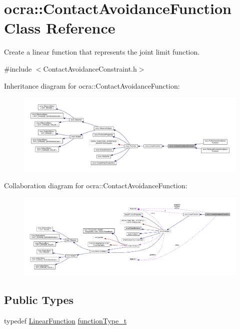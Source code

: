 \hypertarget{classocra_1_1ContactAvoidanceFunction}{}\section{ocra\+:\+:Contact\+Avoidance\+Function Class Reference}
\label{classocra_1_1ContactAvoidanceFunction}


Create a linear function that represents the joint limit function.  




{\ttfamily \#include $<$Contact\+Avoidance\+Constraint.\+h$>$}



Inheritance diagram for ocra\+:\+:Contact\+Avoidance\+Function\+:
\nopagebreak
\begin{figure}[H]
\begin{center}
\leavevmode
\includegraphics[width=350pt]{d5/d61/classocra_1_1ContactAvoidanceFunction__inherit__graph}
\end{center}
\end{figure}


Collaboration diagram for ocra\+:\+:Contact\+Avoidance\+Function\+:
\nopagebreak
\begin{figure}[H]
\begin{center}
\leavevmode
\includegraphics[width=350pt]{d3/d88/classocra_1_1ContactAvoidanceFunction__coll__graph}
\end{center}
\end{figure}
\subsection*{Public Types}
\begin{DoxyCompactItemize}
\item 
typedef \hyperlink{classocra_1_1LinearFunction}{Linear\+Function} \hyperlink{classocra_1_1ContactAvoidanceFunction_a15d14e0a9e8810d1a6990d5ab7e179ab}{function\+Type\+\_\+t}
\end{DoxyCompactItemize}
